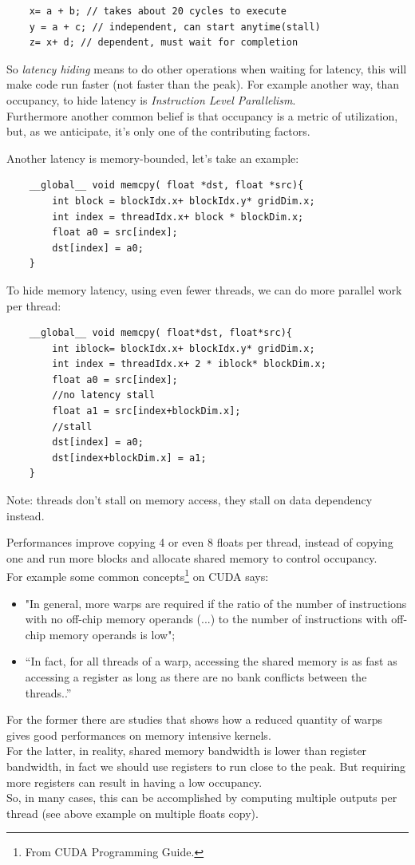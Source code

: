 \begin{lstlisting}
	x= a + b; // takes about 20 cycles to execute
	y = a + c; // independent, can start anytime(stall)
	z= x+ d; // dependent, must wait for completion
\end{lstlisting}
So \textit{latency hiding} means to do other operations when waiting for latency, this will make code run faster (not faster than the peak). For example another way, than occupancy, to hide latency is \textit{Instruction Level Parallelism}.\\
Furthermore another common belief is that occupancy is a metric of utilization, but, as we anticipate, it's only one of the contributing factors.

Another latency is memory-bounded, let's take an example:
\begin{lstlisting}
	__global__ void memcpy( float *dst, float *src){
		int block = blockIdx.x+ blockIdx.y* gridDim.x;
		int index = threadIdx.x+ block * blockDim.x;
		float a0 = src[index];
		dst[index] = a0;
	}
\end{lstlisting}
To hide memory latency, using even fewer threads, we can do more parallel work per thread:
\begin{lstlisting}
	__global__ void memcpy( float*dst, float*src){
		int iblock= blockIdx.x+ blockIdx.y* gridDim.x;
		int index = threadIdx.x+ 2 * iblock* blockDim.x;
		float a0 = src[index]; 
		//no latency stall
		float a1 = src[index+blockDim.x]; 
		//stall
		dst[index] = a0;
		dst[index+blockDim.x] = a1;
	}
\end{lstlisting}
Note: threads don't stall on memory access, they stall on data dependency instead.

Performances improve copying 4 or even 8 floats per thread, instead of copying one and run more blocks and allocate shared memory to control occupancy.\\
For example some common concepts\footnote{From CUDA Programming Guide.} on CUDA says:
\begin{itemize}
\item "In general, more warps are required if the ratio of the number of instructions with no off-chip memory operands (...) to the number of instructions with off-chip memory operands is low";  %
\item “In fact, for all threads of a warp, accessing the shared memory is as fast as accessing a register as long as there are no bank conflicts between the threads..” 
\end{itemize}
For the former there are studies that shows how a reduced quantity of warps gives good performances on memory intensive kernels.\\
For the latter, in reality, shared memory bandwidth is lower than register bandwidth, in fact we should use registers to run close to the peak.
But requiring more registers can result in having a low occupancy.\\
So, in many cases, this can be accomplished by computing multiple outputs per thread (see above example on multiple floats copy)\cite{loweroccupancy}.

